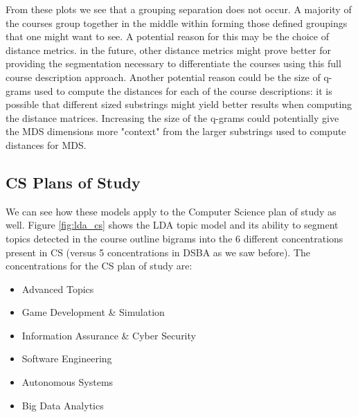\documentclass[11pt]{report}
\begin{document}
From these plots we see that a grouping separation does not occur.  A majority of the courses group together in the middle within forming those defined groupings that one might want to see. A potential reason for this may be the choice of distance metrics. in the future, other distance metrics might prove better for providing the segmentation necessary to differentiate the courses using this full course description approach.  Another potential reason could be the size of q-grams used to compute the distances for each of the course descriptions: it is possible that different sized substrings might yield better results when computing the distance matrices. Increasing the size of the q-grams could potentially give the MDS dimensions more "context" from the larger substrings used to compute distances for MDS. 





\subsection{CS Plans of Study}

We can see how these models apply to the Computer Science plan of study as well. Figure \ref{fig:lda_cs} shows the LDA topic 
model and its ability to segment topics detected in the course outline bigrams into the 6 different concentrations present in CS (versus 5 concentrations in DSBA as we saw before). 
The concentrations for the CS plan of study are: 

\begin{itemize}
  \item Advanced Topics  
  \item Game Development \& Simulation  
  \item Information Assurance \& Cyber Security  
  \item Software Engineering   
  \item Autonomous Systems  
  \item Big Data Analytics  
\end{itemize}
\end{document}
